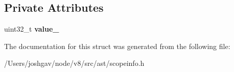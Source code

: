 \subsection*{Private Attributes}
\begin{DoxyCompactItemize}
\item 
uint32\+\_\+t {\bfseries value\+\_\+}\hypertarget{structv8_1_1internal_1_1_context_slot_cache_1_1_value_a7d2aa0fcb72464e9f954f2860cc6f698}{}\label{structv8_1_1internal_1_1_context_slot_cache_1_1_value_a7d2aa0fcb72464e9f954f2860cc6f698}

\end{DoxyCompactItemize}


The documentation for this struct was generated from the following file\+:\begin{DoxyCompactItemize}
\item 
/\+Users/joshgav/node/v8/src/ast/scopeinfo.\+h\end{DoxyCompactItemize}
